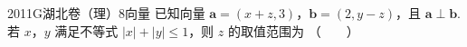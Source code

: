 
\begin{problem}{2011}{G}{湖北卷（理）}{8}{向量}
已知向量 $\boldsymbol{a}=(x+z,3)$，$\boldsymbol{b}=(2,y-z)$，且 $\boldsymbol{a}\perp\boldsymbol{b}$.若 $x$，$y$ 满足不等式 $|x|+|y|\leq1$，则 $z$ 的取值范围为 \hspace{1cm}（　　）
\begin{choices}
\choice{{[-2,2]}}
\choice{{[-2,3]}}
\choice{{[-3,2]}}
\choice{{[-3,3]}}
\end{choices}
\end{problem}

\begin{answer}

\end{answer}

\begin{solutions}

\end{solutions}
